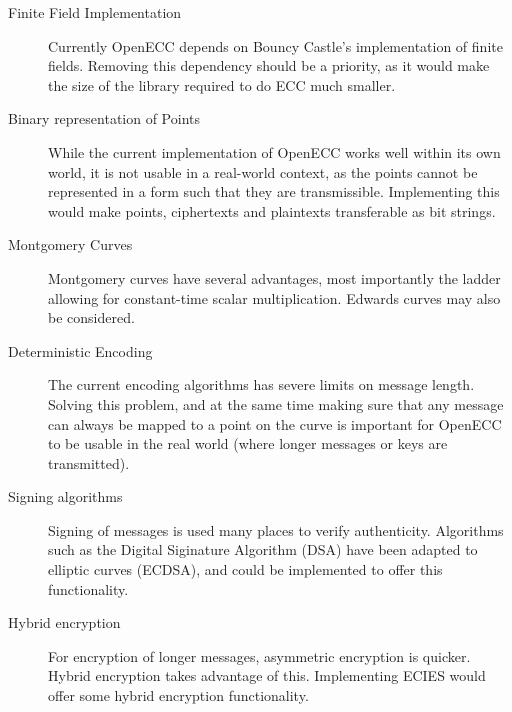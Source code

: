 \begin{description}
    \item[Finite Field Implementation] Currently OpenECC depends on Bouncy Castle's implementation of finite fields.
        Removing this dependency should be a priority, as it would make the size of the library required to do ECC
        much smaller.
    \item[Binary representation of Points] While the current implementation of OpenECC works well within its own world,
        it is not usable in a real-world context, as the points cannot be represented in a form such that they are
        transmissible. Implementing this would make points, ciphertexts and plaintexts transferable as bit strings.
    \item[Montgomery Curves] Montgomery curves have several advantages, most importantly the ladder allowing for constant-time
        scalar multiplication. Edwards curves may also be considered.
    \item[Deterministic Encoding] The current encoding algorithms has severe limits on message length. Solving this problem,
        and at the same time making sure that any message can always be mapped to a point on the curve is important for
        OpenECC to be usable in the real world (where longer messages or keys are transmitted).
    \item[Signing algorithms] Signing of messages is used many places to verify authenticity. Algorithms such as the Digital
        Siginature Algorithm (DSA) have been adapted to elliptic curves (ECDSA), and could be implemented to offer this
        functionality.
    \item[Hybrid encryption] For encryption of longer messages, asymmetric encryption is quicker. Hybrid encryption takes
        advantage of this. Implementing ECIES would offer some hybrid encryption functionality.
\end{description}